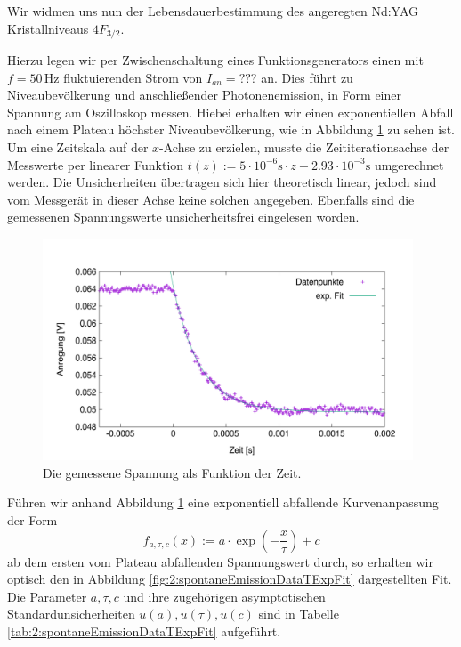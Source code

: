 \documentclass[../../main.tex]{subfiles}
\begin{document}
    Wir widmen uns nun der Lebensdauerbestimmung des angeregten Nd:YAG Kristallniveaus $4F_{3/2}$. 

    Hierzu legen wir per Zwischenschaltung eines Funktionsgenerators einen mit $f = 50\,\si{\hertz}$ fluktuierenden Strom von $I_{\textit{an}} = ???$ an. Dies führt zu Niveaubevölkerung und anschließender Photonenemission, in Form einer Spannung am Oszilloskop messen. Hiebei erhalten wir einen exponentiellen Abfall nach einem Plateau höchster Niveaubevölkerung, wie in Abbildung \ref{fig:2:spontaneEmissionDataT} zu sehen ist. Um eine Zeitskala auf der $x$-Achse zu erzielen, musste die Zeititerationsachse der Messwerte per linearer Funktion $t(z) := 5\cdot 10^{-6}\si{\s}\cdot z - 2.93\cdot 10^{-3}\si{\s}$ umgerechnet werden. Die Unsicherheiten übertragen sich hier theoretisch linear, jedoch sind vom Messgerät in dieser Achse keine solchen angegeben. Ebenfalls sind die gemessenen Spannungswerte unsicherheitsfrei eingelesen worden. 
    \begin{figure}[H]
        \centering
        \includegraphics[width=11cm]{../../Bilddateien/2/spontane_emission_data_t.png}
        \caption{Die gemessene Spannung als Funktion der Zeit.}
        \label{fig:2:spontaneEmissionDataT}
    \end{figure}
    Führen wir anhand Abbildung \ref{fig:2:spontaneEmissionDataT} eine exponentiell abfallende Kurvenanpassung der Form 
    \[
        f_{a,\tau,c}(x) := a\cdot \exp(-\frac{x}{\tau}) + c
    \]
    ab dem ersten vom Plateau abfallenden Spannungswert durch, so erhalten wir optisch den in Abbildung \ref{fig:2:spontaneEmissionDataTExpFit} dargestellten Fit. Die Parameter $a,\tau,c$ und ihre zugehörigen asymptotischen Standardunsicherheiten $u(a),u(\tau),u(c)$ sind in Tabelle \ref{tab:2:spontaneEmissionDataTExpFit} aufgeführt.
    
\end{document}
